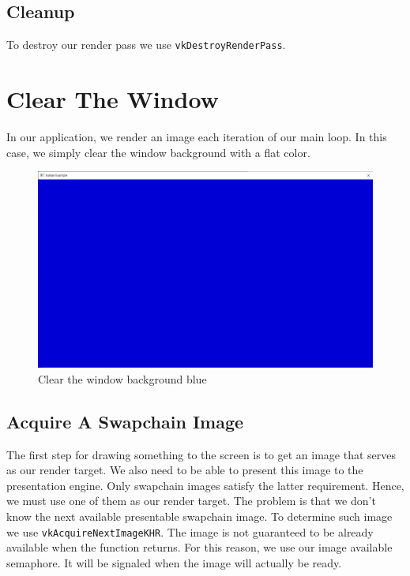 \begin{minipage}{\linewidth}{\noindent}
    
\end{minipage}

\subsection{Cleanup}

To destroy our render pass we use \texttt{vkDestroyRenderPass}.

\section{Clear The Window}

In our application, we render an image each iteration of our main loop.
In this case, we simply clear the window background with a flat color.

\begin{figure}[ht]
    \centering
    \includegraphics[scale=0.20]{images/ChClearWindow/ClearWindow.png}
    \caption{Clear the window background blue}
    \label{fig::ClearWindow}
\end{figure}

\subsection{Acquire A Swapchain Image}

The first step for drawing something to the screen is to get an image that serves
as our render target.
We also need to be able to present this image to the presentation engine.
Only swapchain images satisfy the latter requirement.
Hence, we must use one of them as our render target.
The problem is that we don't know the next available presentable swapchain image.
To determine such image we use \texttt{vkAcquireNextImageKHR}.
The image is not guaranteed to be already available when the function returns.
For this reason, we use our image available semaphore.
It will be signaled when the image will actually be ready.

